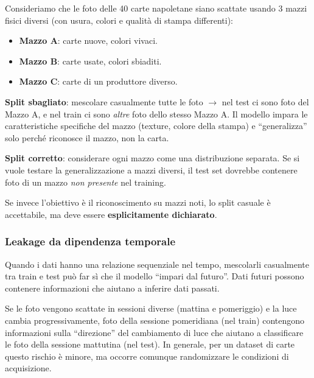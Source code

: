 \documentclass[a4paper,12pt]{article}
\begin{document}
\begin{esempio}
Consideriamo che le foto delle 40 carte napoletane siano scattate usando 3 mazzi fisici diversi (con usura, colori e qualità di stampa differenti):
\begin{itemize}[noitemsep]
    \item \textbf{Mazzo A}: carte nuove, colori vivaci.
    \item \textbf{Mazzo B}: carte usate, colori sbiaditi.
    \item \textbf{Mazzo C}: carte di un produttore diverso.
\end{itemize}

\textbf{Split sbagliato}: mescolare casualmente tutte le foto $\rightarrow$ nel test ci sono foto del Mazzo A, e nel train ci sono \emph{altre} foto dello stesso Mazzo A. Il modello impara le caratteristiche specifiche del mazzo (texture, colore della stampa) e ``generalizza'' solo perché riconosce il mazzo, non la carta.

\textbf{Split corretto}: considerare ogni mazzo come una distribuzione separata. Se si vuole testare la generalizzazione a mazzi diversi, il test set dovrebbe contenere foto di un mazzo \emph{non presente} nel training.

Se invece l'obiettivo è il riconoscimento su mazzi noti, lo split casuale è accettabile, ma deve essere \textbf{esplicitamente dichiarato}.
\end{esempio}

\subsubsection{Leakage da dipendenza temporale}

Quando i dati hanno una relazione sequenziale nel tempo, mescolarli casualmente tra train e test può far sì che il modello ``impari dal futuro''. Dati futuri possono contenere informazioni che aiutano a inferire dati passati.

\begin{esempio}
Se le foto vengono scattate in sessioni diverse (mattina e pomeriggio) e la luce cambia progressivamente, foto della sessione pomeridiana (nel train) contengono informazioni sulla ``direzione'' del cambiamento di luce che aiutano a classificare le foto della sessione mattutina (nel test). In generale, per un dataset di carte questo rischio è minore, ma occorre comunque randomizzare le condizioni di acquisizione.
\end{esempio}
\end{document}
